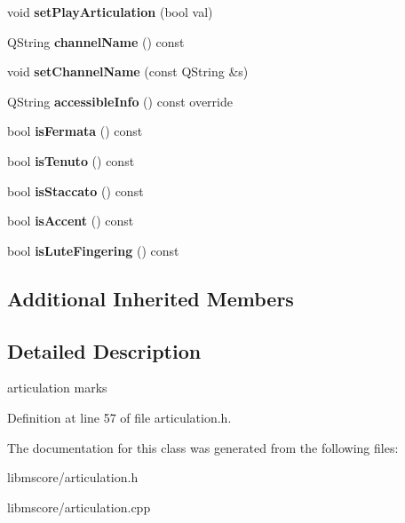 \begin{DoxyCompactItemize}
\item 
\mbox{\label{class_ms_1_1_articulation_a0bd41c0fa67bb0807def02189e8241e0}} 
void {\bfseries set\+Play\+Articulation} (bool val)
\item 
\mbox{\label{class_ms_1_1_articulation_a66f1fc69735651925e0fe2aff66c55f4}} 
Q\+String {\bfseries channel\+Name} () const
\item 
\mbox{\label{class_ms_1_1_articulation_a21ef9dd3d2bd330144820c6fb31f170a}} 
void {\bfseries set\+Channel\+Name} (const Q\+String \&s)
\item 
\mbox{\label{class_ms_1_1_articulation_ab79723ac30aeef88241619dc39b82c5c}} 
Q\+String {\bfseries accessible\+Info} () const override
\item 
\mbox{\label{class_ms_1_1_articulation_a945d66f0e8068255c9b4038f41fc3e4d}} 
bool {\bfseries is\+Fermata} () const
\item 
\mbox{\label{class_ms_1_1_articulation_a1a79e37216772c78763a2e814b1695c7}} 
bool {\bfseries is\+Tenuto} () const
\item 
\mbox{\label{class_ms_1_1_articulation_a1f004f3fa91ee7c160cc5d48680c12e5}} 
bool {\bfseries is\+Staccato} () const
\item 
\mbox{\label{class_ms_1_1_articulation_ad8f5e3b36649f1f7aa3a5a9d2f475ad1}} 
bool {\bfseries is\+Accent} () const
\item 
\mbox{\label{class_ms_1_1_articulation_a5d5996e68b2e87bd6e684ac0c06846d9}} 
bool {\bfseries is\+Lute\+Fingering} () const
\end{DoxyCompactItemize}
\subsection*{Additional Inherited Members}


\subsection{Detailed Description}
articulation marks 

Definition at line 57 of file articulation.\+h.



The documentation for this class was generated from the following files\+:\begin{DoxyCompactItemize}
\item 
libmscore/articulation.\+h\item 
libmscore/articulation.\+cpp\end{DoxyCompactItemize}
